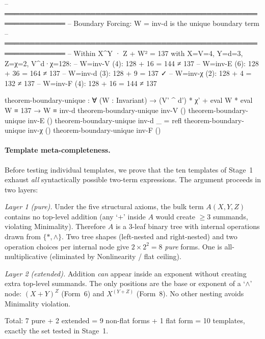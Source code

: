 \documentclass[11pt,a4paper]{article}
\begin{document}
\begin{code}
-- ══════════════════════════════════════════════════════════════
-- Boundary Forcing: W = inv-d is the unique boundary term
-- ══════════════════════════════════════════════════════════════
-- Within X^Y · Z + W² = 137 with X=V=4, Y=d=3, Z=χ=2, V^d·χ=128:
-- W=inv-V (4): 128 + 16 = 144 ≠ 137
-- W=inv-E (6): 128 + 36 = 164 ≠ 137
-- W=inv-d (3): 128 + 9  = 137 ✓
-- W=inv-χ (2): 128 + 4  = 132 ≠ 137
-- W=inv-F (4): 128 + 16 = 144 ≠ 137

theorem-boundary-unique : ∀ (W : Invariant) →
  (V' ^ d') * χ' + eval W * eval W ≡ 137 → W ≡ inv-d
theorem-boundary-unique inv-V ()
theorem-boundary-unique inv-E ()
theorem-boundary-unique inv-d _ = refl
theorem-boundary-unique inv-χ ()
theorem-boundary-unique inv-F ()
\end{code}

\paragraph{Template meta-completeness.}
Before testing individual templates, we prove that the ten templates of
Stage~1 exhaust \emph{all} syntactically possible two-term expressions.
The argument proceeds in two layers:

\emph{Layer 1 (pure).}  Under the five structural axioms, the bulk term
$A(X,Y,Z)$ contains no top-level addition (any `$+$' inside $A$ would
create $\geq 3$ summands, violating Minimality). Therefore $A$ is a
3-leaf binary tree with internal operations drawn from $\{*,\wedge\}$.
Two tree shapes (left-nested and right-nested) and two operation choices
per internal node give $2 \times 2^2 = 8$ \emph{pure} forms. One is
all-multiplicative (eliminated by Nonlinearity / flat ceiling).

\emph{Layer 2 (extended).}  Addition \emph{can} appear inside an
exponent without creating extra top-level summands. The only positions
are the base or exponent of a `$\wedge$' node: $(X+Y)^Z$ (Form~6) and
$X^{(Y+Z)}$ (Form~8). No other nesting avoids Minimality violation.

Total: 7 pure + 2 extended = 9 non-flat forms + 1 flat form = 10
templates, exactly the set tested in Stage~1.
\end{document}
